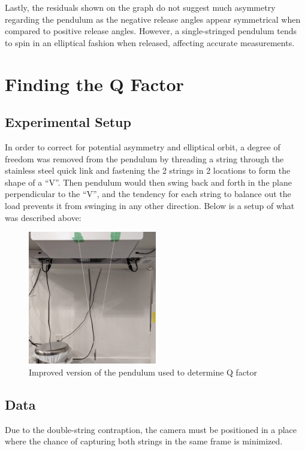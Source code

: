 \documentclass[12pt]{article}
\begin{document}
Lastly, the residuals shown on the graph do not suggest much asymmetry regarding the pendulum as the negative release angles appear symmetrical when compared to positive release angles. However, a single-stringed pendulum tends to spin in an elliptical fashion when released, affecting accurate measurements.

\section{Finding the Q Factor}

\subsection{Experimental Setup}
In order to correct for potential asymmetry and elliptical orbit, a degree of freedom was removed from the pendulum by threading a string through the stainless steel quick link and fastening the 2 strings in 2 locations to form the shape of a ``V''. Then pendulum would then swing back and forth in the plane perpendicular to the ``V'', and the tendency for each string to balance out the load prevents it from swinging in any other direction. Below is a setup of what was described above:
\begin{figure}[!hptb]
    \centering
    \includegraphics[width=0.5\textwidth]{../figures/exp_setup2.jpg}
    \caption{\centering Improved version of the pendulum used to determine Q factor}
    \label{fig:figure 3}
\end{figure}

\newpage

\subsection{Data}
Due to the double-string contraption, the camera must be positioned in a place where the chance of capturing both strings in the same frame is minimized.
\end{document}
